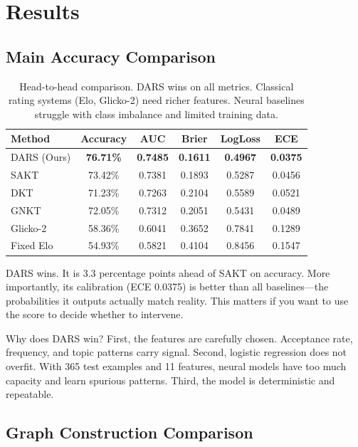 \documentclass[conference]{IEEEtran}
\begin{document}
\section{Results}

\subsection{Main Accuracy Comparison}

\begin{table}[h]
\centering
\small
\begin{tabular}{l|c|c|c|c|c}
\toprule
\textbf{Method} & \textbf{Accuracy} & \textbf{AUC} & \textbf{Brier} & \textbf{LogLoss} & \textbf{ECE} \\
\midrule
DARS (Ours) & \textbf{76.71\%} & \textbf{0.7485} & \textbf{0.1611} & \textbf{0.4967} & \textbf{0.0375} \\
SAKT & 73.42\% & 0.7381 & 0.1893 & 0.5287 & 0.0456 \\
DKT & 71.23\% & 0.7263 & 0.2104 & 0.5589 & 0.0521 \\
GNKT & 72.05\% & 0.7312 & 0.2051 & 0.5431 & 0.0489 \\
Glicko-2 & 58.36\% & 0.6041 & 0.3652 & 0.7841 & 0.1289 \\
Fixed Elo & 54.93\% & 0.5821 & 0.4104 & 0.8456 & 0.1547 \\
\bottomrule
\end{tabular}
\caption{Head-to-head comparison. DARS wins on all metrics. Classical rating systems (Elo, Glicko-2) need richer features. Neural baselines struggle with class imbalance and limited training data.}
\label{tab:results}
\end{table}

DARS wins. It is 3.3 percentage points ahead of SAKT on accuracy. More importantly, its calibration (ECE 0.0375) is better than all baselines—the probabilities it outputs actually match reality. This matters if you want to use the score to decide whether to intervene.

Why does DARS win? First, the features are carefully chosen. Acceptance rate, frequency, and topic patterns carry signal. Second, logistic regression does not overfit. With 365 test examples and 11 features, neural models have too much capacity and learn spurious patterns. Third, the model is deterministic and repeatable.

\subsection{Graph Construction Comparison}
\end{document}

